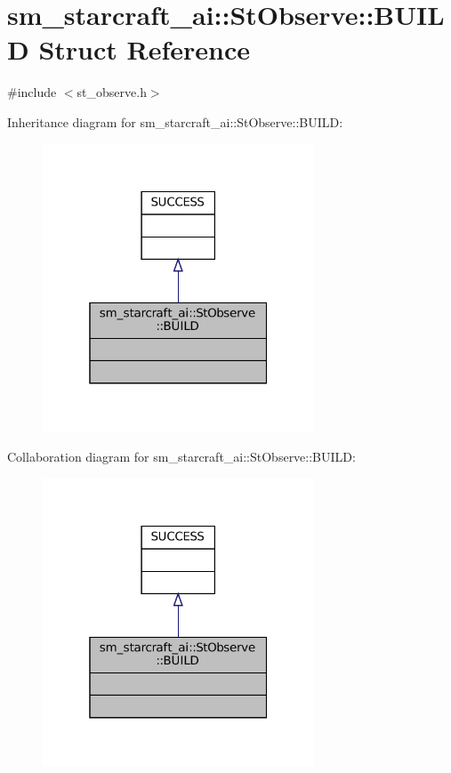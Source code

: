 \hypertarget{structsm__starcraft__ai_1_1StObserve_1_1BUILD}{}\section{sm\+\_\+starcraft\+\_\+ai\+:\+:St\+Observe\+:\+:B\+U\+I\+LD Struct Reference}
\label{structsm__starcraft__ai_1_1StObserve_1_1BUILD}


{\ttfamily \#include $<$st\+\_\+observe.\+h$>$}



Inheritance diagram for sm\+\_\+starcraft\+\_\+ai\+:\+:St\+Observe\+:\+:B\+U\+I\+LD\+:
\nopagebreak
\begin{figure}[H]
\begin{center}
\leavevmode
\includegraphics[width=229pt]{structsm__starcraft__ai_1_1StObserve_1_1BUILD__inherit__graph}
\end{center}
\end{figure}


Collaboration diagram for sm\+\_\+starcraft\+\_\+ai\+:\+:St\+Observe\+:\+:B\+U\+I\+LD\+:
\nopagebreak
\begin{figure}[H]
\begin{center}
\leavevmode
\includegraphics[width=229pt]{structsm__starcraft__ai_1_1StObserve_1_1BUILD__coll__graph}
\end{center}
\end{figure}


